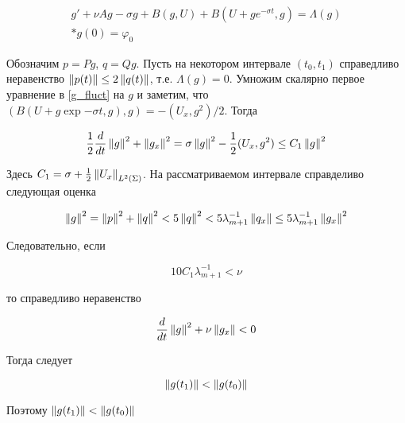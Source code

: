 \begin{gather}\label{g_fluct}
    g' + \nu Ag - \sigma g + B(g, U) + B(U + ge^{-\sigma t}, g) = \Lambda(g)\\*
    g(0) = \varphi_0
\end{gather}

Обозначим $p = Pg$, $q = Qg$. Пусть на некотором интервале $(t_0, t_1)$
справедливо неравенство $\left\lVert p(t)\right\rVert \le 2 \left\lVert q(t)\right\rVert$, т.е. $\Lambda(g) = 0$.
Умножим скалярно первое уравнение в \eqref{g_fluct} на $g$ и заметим, что $(B(U
+ g \exp{-\sigma t}, g), g) = -(U_x, g^2) / 2$. Тогда

\begin{gather*}
    \frac{1}{2}\frac{d}{dt}\left\lVert g\right\rVert^2 + \left\lVert g_x\right\rVert^2 = \sigma \left\lVert g\right\rVert^2 -
    \frac{1}{2}(U_x, g^2) \le C_1\left\lVert g\right\rVert^2
\end{gather*}

Здесь $C_1 = \sigma + \frac{1}{2}\left\lVert U_{x}\right\rVert_{L^2(\Sigma)}$. На рассматриваемом 
интервале справделиво следующая оценка

\begin{gather*}
    \left\lVert g\right\rVert^2 = \left\lVert p\right\rVert^2 + \left\lVert q\right\rVert^2 < 5\left\lVert q\right\rVert^2 < 5\lambda^{-1}_{m +
    1}\left\lVert q_x\right\rVert \le 5 \lambda^{-1}_{m + 1}\left\lVert g_x\right\rVert^2
\end{gather*}

Следовательно, если 

\begin{equation}
    10C_1 \lambda_{m + 1}^{-1} < \nu
\end{equation}

то справедливо неравенство

\begin{equation}
    \frac{d}{dt}\left\lVert g\right\rVert^2 + \nu \left\lVert g_x\right\rVert < 0
\end{equation}

Тогда следует

\begin{equation}\label{8}
    \left\lVert g(t_1)\right\rVert < \left\lVert g(t_0)\right\rVert
\end{equation}

Поэтому $\left\lVert g(t_1)\right\rVert < \left\lVert g(t_0)\right\rVert$\\



